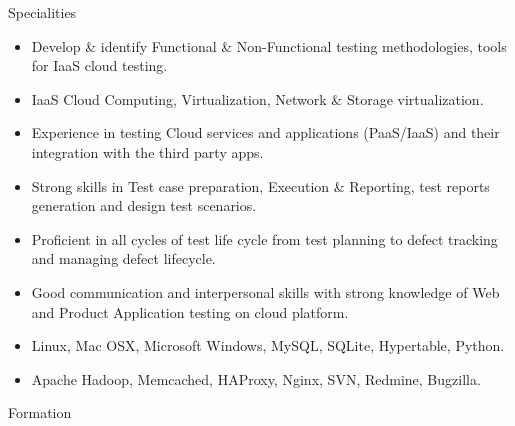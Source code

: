 \documentclass[a4paper,12pt]{article}
\begin{document}
\begin{resumesummary}{Specialities}
\begin{itemize}
  \item Develop \& identify Functional \& Non-Functional testing methodologies, tools for IaaS cloud testing.
  \item IaaS Cloud Computing, Virtualization, Network \& Storage virtualization.
  \item Experience in testing Cloud services and applications (PaaS/IaaS) and their integration with the third party apps.
  \item Strong skills in Test case preparation, Execution \& Reporting, test reports generation and design test scenarios.
  \item Proficient in all cycles of test life cycle from test planning to defect tracking and managing defect lifecycle.
  \item Good communication and interpersonal skills with strong knowledge of Web and Product Application testing on cloud platform.
  \item Linux, Mac OSX, Microsoft Windows, MySQL, SQLite, Hypertable, Python.
  \item Apache Hadoop, Memcached, HAProxy, Nginx, SVN, Redmine, Bugzilla.
\newline
\end{itemize}
\end{resumesummary}


\begin{resumeblock}{Formation}
\newline
{}\\
\newline
{}\\ 
\newline
{} \\
\newline
{} 
\largeskip
\end{resumeblock}
\end{document}
